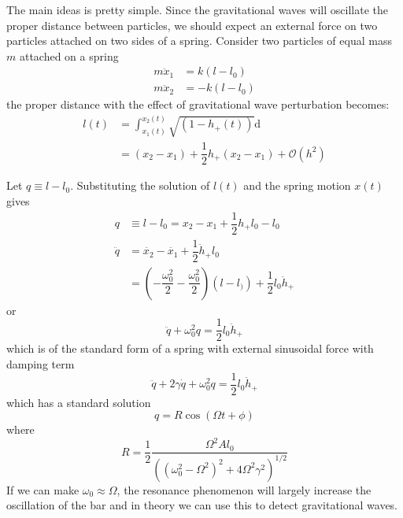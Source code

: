 \documentclass[10pt]{article}
\begin{document}
The main ideas is pretty simple. Since the gravitational waves will oscillate the proper distance between particles, we should expect an external force on two particles attached on two sides of a spring. Consider two particles of equal mass $ m $ attached on a spring
\begin{equation}\label{eq: motion_of_spring}
\begin{aligned}
m \ddot{x}_1&=k (l-l_0)\\
m \ddot{x}_2&=-k (l-l_0)
\end{aligned}
\end{equation}
the proper distance with the effect of gravitational wave perturbation becomes:
\begin{equation}\label{eq: proper_distance_spring}
\begin{aligned}
l(t)&=\int_{x_1(t)}^{x_2(t)} \sqrt{(1-h_+(t))} \mathrm{d}\\
&=(x_2-x_1) +\dfrac{1}{2} h_+(x_2-x_1)+\mathcal{O}(h^2)
\end{aligned}
\end{equation}

Let $ q \equiv l-l_0 $. Substituting the solution of $ l(t) $ and the spring motion $ x(t) $ gives
 \begin{equation}\label{eq: derive_motion_q}
 \begin{aligned}
 q &\equiv l-l_0 = x_2-x_1 +\dfrac{1}{2} h_+ l_0 - l_0\\
 \ddot{q} &= \ddot{x_2}-\ddot{x_1}+\dfrac{1}{2} \ddot{h}_+  l_0\\
 &=(-\dfrac{\omega_0^2}{2}-\dfrac{\omega_0^2}{2})(l-l_))+\dfrac{1}{2} l_0 \ddot{h}_+
 \end{aligned}
 \end{equation}
or 
\begin{equation}\label{eq: motion_q}
\ddot{q}+\omega_0^2 q=\dfrac{1}{2} l_0 \ddot{h}_+
\end{equation}
which is of the standard form of a spring with external sinusoidal force with damping term
\begin{equation}\label{eq: standard_motion}
\ddot{q}+2 \gamma \dot{q}+ \omega_0^2 q=\dfrac{1}{2} l_0 \ddot{h}_+
\end{equation}
which has a standard solution
\begin{equation}\label{eq: sln_q}
q=R \cos (\Omega t+\phi)
\end{equation}
where
\begin{equation}\label{eq: R_term}
R=\dfrac{1}{2} \dfrac{\Omega^2 A l_0}{((\omega_0^2-\Omega^2)^2+4\Omega^2 \gamma^2)^{1/2}}
\end{equation}
If we can make $ \omega_0 \approx \Omega $, the resonance phenomenon will largely increase the oscillation of the bar and in theory we can use this to detect gravitational waves.
\end{document}
